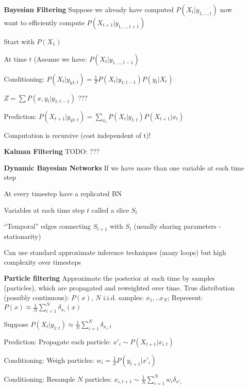 \documentclass[a4paper, 11pt, landscape]{article}
\begin{document}
\begin{multicols*}{3}
\textbf{Bayesian Filtering}
Suppose we already have computed $P(X_t | y_{1,...,t})$ now want to efficiently compute $P(X_{t+1} | y_{1,...,t+1})$

\begin{compactitem}
	\item Start with $P(X_1)$
	\item At time $t$ (Assume we have:  $P(X_t | y_{1,...,t-1})$
	\item Conditioning: $P(X_t | y_{y1:t}) = \frac{1}{Z} P(X_t | y_{1:t-1})P(y_t | X_t)$
	\item $Z= \sum P(x,y_t | y_{1:t-1})$ ???
	\item Prediction: $P(X_{t+1} | y_{y1:t}) = \sum_{x_t}  P(X_t | y_{1:t}) P(X_{t+1} | x_t)$
\end{compactitem}
Computation is recursive (cost independent of t)!

\textbf{Kalman Filtering}
TODO: ???

\textbf{Dynamic Bayesian Networks}
If we have more than one variable at each time step
\begin{compactitem}
	\item At every timestep have a replicated BN
	\item Variables at each time step $t$ called a slice $S_t$
	\item “Temporal” edges connecting $S_{t+1}$ with $S_t$ (usually sharing parameters - stationarity)
	\item Can use standard approximate inference techniques (many loops) but high complexity over timesteps
\end{compactitem}


\textbf{Particle filtering}
Approximate the posterior at each time by samples (particles), which are propagated and reweighted over time.
True distribution (possibly continuous): $P(x)$, $N$ i.i.d. samples: $x_1,..x_N$; Represent: $P(x) \approx \frac{1}{N} \sum_{i=1}^{N} \delta_{x_i}(x)$

\begin{compactitem}
	\item Suppose $P(X_t | y_{1:t}) \approx \frac{1}{N} \sum_{i=1}^{N} \delta_{x_i, t}$
	\item Prediction: Propagate each particle: $x'_i \sim P(X_{t+1} | x_{i,t})$
	\item Conditioning: Weigh particles: $w_i = \frac{1}{Z}P(y_{t+1} | x'_i)$
	\item Conditioning: Resample $N$ particles: $x_{i, t+1} \sim \frac{1}{N} \sum_{i=1}^{N} w_i\delta_{x'_i}$ 
\end{compactitem}


\end{multicols*}
\end{document}
